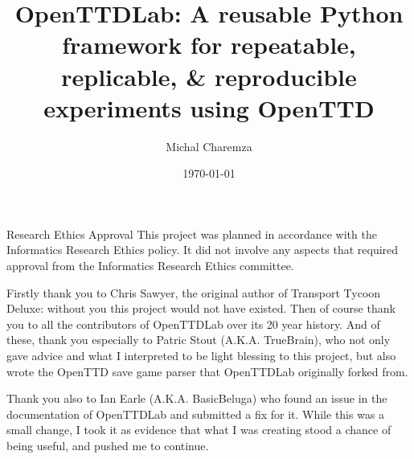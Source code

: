 \documentclass[logo,msc,dsti]{style/infthesis}    %
\begin{document}
\begin{preliminary}

\title{OpenTTDLab: A reusable Python framework for repeatable, replicable, \& reproducible experiments using OpenTTD}

\author{Michal Charemza}

\date{\today}


\maketitle

\newenvironment{ethics}
   {\begin{frontenv}{Research Ethics Approval}{\LARGE}}
   {\end{frontenv}\newpage}

\begin{ethics}
This project was planned in accordance with the Informatics Research
Ethics policy. It did not involve any aspects that required approval
from the Informatics Research Ethics committee.
\standarddeclaration
\end{ethics}

\begin{acknowledgements}

Firstly thank you to Chris Sawyer, the original author of Transport Tycoon Deluxe: without you this project would not have existed. Then of course thank you to all the contributors of OpenTTDLab over its 20 year history. And of these, thank you especially to Patric Stout (A.K.A. TrueBrain), who not only gave advice and what I interpreted to be light blessing to this project, but also wrote the OpenTTD save game parser that OpenTTDLab originally forked from.

Thank you also to Ian Earle (A.K.A. BasicBeluga) who found an issue in the documentation of OpenTTDLab and submitted a fix for it. While this was a small change, I took it as evidence that what I was creating stood a chance of being useful, and pushed me to continue.


\end{acknowledgements}
\end{preliminary}
\end{document}
